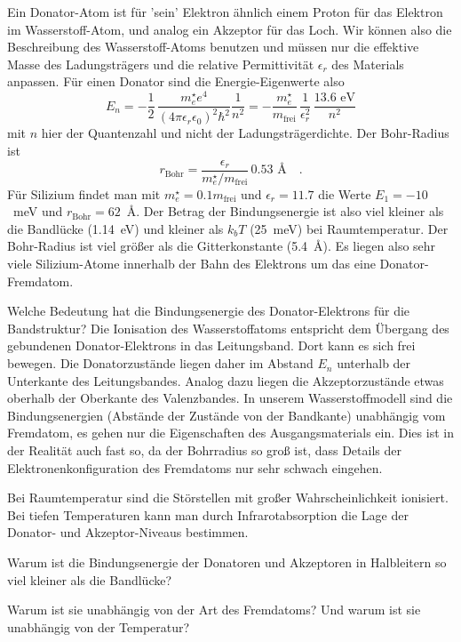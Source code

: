 Ein Donator-Atom ist für 'sein' Elektron ähnlich einem Proton für das Elektron im Wasserstoff-Atom, und analog ein Akzeptor für das Loch. Wir können also die Beschreibung des Wasserstoff-Atoms benutzen und müssen nur die effektive Masse des Ladungsträgers und die relative Permittivität $\epsilon_r$ des Materials anpassen. Für einen Donator sind die Energie-Eigenwerte also 
\begin{equation}
    E_n = - \frac{1}{2} \, \frac{m_e^\star e^4}{(4 \pi \epsilon_r \epsilon_0)^2 \hbar^2}
\frac{1}{n^2} =     
   - \frac{m_e^\star}{m_\text{frei}} \, \frac{1}{\epsilon_r^2} \, \frac{13.6 \text{ eV}}{n^2}
\end{equation}
mit $n$ hier der Quantenzahl und nicht der Ladungsträgerdichte. Der Bohr-Radius ist
\begin{equation}
    r_\text{Bohr} = \frac{\epsilon_r}{m_e^\star / m_\text{frei}} \, 0.53 \text{ \AA} \quad .
\end{equation}
Für Silizium findet man mit $m_e^\star = 0.1 m_\text{frei}$ und $\epsilon_r = 11.7$ die Werte $E_1 = -10$~meV und $ r_\text{Bohr} = 62$~\AA. Der Betrag der Bindungsenergie ist also viel kleiner als die Bandlücke (1.14~eV) und kleiner als $k_b T$ (25~meV) bei Raumtemperatur. Der Bohr-Radius ist viel größer als die Gitterkonstante (5.4~\AA). Es liegen also sehr viele Silizium-Atome innerhalb der Bahn des Elektrons um das eine Donator-Fremdatom.

Welche Bedeutung hat die Bindungsenergie des Donator-Elektrons für die Bandstruktur? Die Ionisation des Wasserstoffatoms entspricht dem Übergang des gebundenen Donator-Elektrons in das Leitungsband. Dort kann es sich frei bewegen. Die Donatorzustände liegen daher im Abstand $E_n$ unterhalb der Unterkante des Leitungsbandes. Analog dazu liegen die Akzeptorzustände etwas oberhalb der Oberkante des Valenzbandes. In unserem Wasserstoffmodell sind die Bindungsenergien (Abstände der Zustände von der Bandkante) unabhängig vom Fremdatom, es gehen nur die Eigenschaften des Ausgangsmaterials ein. Dies ist in der Realität auch fast so, da der Bohrradius so groß ist, dass Details der Elektronenkonfiguration des Fremdatoms nur sehr schwach eingehen.

Bei Raumtemperatur sind die Störstellen mit großer Wahrscheinlichkeit ionisiert. Bei tiefen Temperaturen kann man durch Infrarotabsorption die Lage der Donator- und Akzeptor-Niveaus bestimmen.

\begin{questions}
    \item Warum ist die Bindungsenergie der Donatoren und Akzeptoren in Halbleitern so viel kleiner als die Bandlücke?
    \item Warum ist sie unabhängig von der Art des Fremdatoms? Und warum ist sie unabhängig von der Temperatur?
\end{questions}



